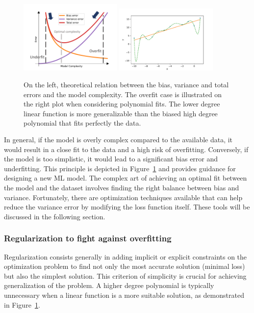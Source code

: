 \documentclass[main]{subfiles}
\begin{document}
\begin{figure}[ht]
  \centering
    \includegraphics[width=0.45\textwidth]{figures/4-ml/Bias_variance_tradeoff.pdf}
    \includegraphics[width=0.45\textwidth]{figures/4-ml/overfit.pdf}
    \caption{On the left, theoretical relation between the bias, variance and total errors and the model complexity. The overfit case is illustrated on the right plot when considering polynomial fits. The lower degree linear function is more generalizable than the biased high degree polynomial that fits perfectly the data.}\label{fgr:bias_variance}
\end{figure}

In general, if the model is overly complex compared to the available data, it would result in a close fit to the data and a high risk of overfitting. Conversely, if the model is too simplistic, it would lead to a significant bias error and underfitting. This principle is depicted in Figure~\ref{fgr:bias_variance} and provides guidance for designing a new ML model.
The complex art of achieving an optimal fit between the model and the dataset involves finding the right balance between bias and variance. Fortunately, there are optimization techniques available that can help reduce the variance error by modifying the loss function itself. These tools will be discussed in the following section.

\subsubsection{Regularization to fight against overfitting}

Regularization consists generally in adding implicit or explicit constraints on the optimization problem to find not only the most accurate solution (minimal loss) but also the simplest solution. This criterion of simplicity is crucial for achieving generalization of the problem. A higher degree polynomial is typically unnecessary when a linear function is a more suitable solution, as demonstrated in Figure~\ref{fgr:bias_variance}. 
\end{document}
